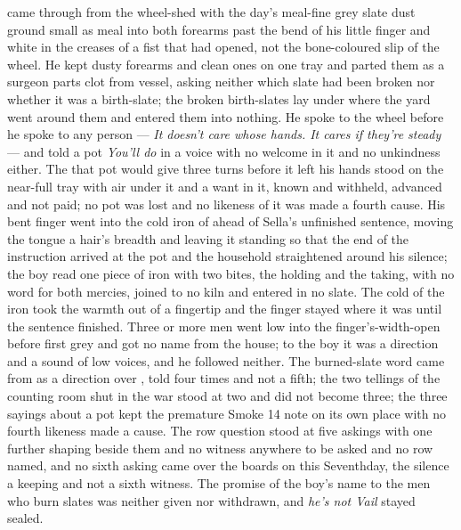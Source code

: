  came through from the wheel-shed with the day's meal-fine grey slate dust ground small as meal into both forearms past the bend of his little finger and white in the creases of a fist that had opened, not the bone-coloured slip of the wheel. He kept dusty forearms and clean ones on one tray and parted them as a surgeon parts clot from vessel, asking neither which slate had been broken nor whether it was a birth-slate; the broken birth-slates lay under  where the yard went around them and entered them into nothing. He spoke to the wheel before he spoke to any person --- \emph{It doesn't care whose hands. It cares if they're steady} --- and told a pot \emph{You'll do} in a voice with no welcome in it and no unkindness either. The  that pot would give three turns before it left his hands stood on the near-full tray with air under it and a want in it, known and withheld, advanced and not paid; no pot was lost and no likeness of it was made a fourth cause. His bent finger went into the cold iron of  ahead of Sella's unfinished sentence, moving the tongue a hair's breadth and leaving it standing so that the end of the instruction arrived at the pot and the household straightened around his silence; the boy read one piece of iron with two bites, the holding and the taking, with no  word for both mercies, joined to no kiln and entered in no slate. The cold of the iron took the warmth out of a fingertip and the finger stayed where it was until the sentence finished. Three or more men went low into the finger's-width-open  before first grey and got no name from the house; to the boy it was a direction and a sound of low voices, and he followed neither. The burned-slate word came from  as a direction over , told four times and not a fifth; the two tellings of the counting room shut in the war stood at two and did not become three; the three sayings about a pot kept the premature Smoke 14 note on its own place with no fourth likeness made a cause. The row question stood at five askings with one further shaping beside them and no witness anywhere to be asked and no row named, and no sixth asking came over the boards on this Seventhday, the silence a keeping and not a sixth witness. The promise of the boy's name to the men who burn slates was neither given nor withdrawn, and \emph{he's not Vail} stayed sealed.

\scenebreak

